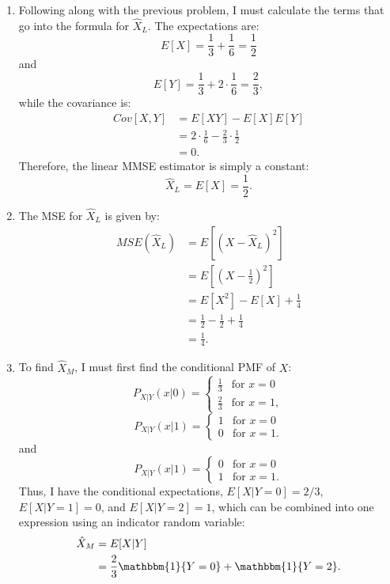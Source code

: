 \begin{problem}{12} $ $
\begin{enumerate}
\item Following along with the previous problem, I must calculate the terms that go into the formula for $\hat X_L$.  The expectations are:
\begin{equation*}
E[X] = \frac{1}{3}+\frac{1}{6} = \frac{1}{2}
\end{equation*}
and
\begin{equation*}
E[Y] = \frac{1}{3}+2\cdot \frac{1}{6} = \frac{2}{3},
\end{equation*}
while the covariance is:
\begin{align*}
Cov[X, Y] &= E[XY] -E[X]E[Y] \\
& = 2\cdot \frac{1}{6}-\frac{2}{3}\cdot \frac{1}{2} \\
& = 0.
\end{align*}
Therefore, the linear MMSE estimator is simply a constant:
\begin{equation*}
\hat X_L = E[X] = \frac{1}{2}.
\end{equation*}

\item The MSE for $\hat X_L$ is given by:
\begin{align*}
MSE(\hat X_L) & = E[(X-\hat X_L)^2] \\
& = E[(X-\frac{1}{2})^2] \\
& = E[X^2]-E[X]+\frac{1}{4} \\
& =\frac{1}{2}-\frac{1}{2}+\frac{1}{4} \\
& = \frac{1}{4}.
\end{align*}

\item To find $\hat X_M$, I must first find the conditional PMF of $X$:
\[
P_{X|Y}(x|0)=
  \begin{cases}
                                   \frac{1}{3}& \text{for $x=0$} \\
                                   \frac{2}{3} & \text{for $x=1$},
  \end{cases}
\]
\[
P_{X|Y}(x|1)=
  \begin{cases}
                                  1& \text{for $x=0$} \\
                                   0 & \text{for $x=1$}.
  \end{cases}
\]
and
\[
P_{X|Y}(x|1)=
  \begin{cases}
                                  0& \text{for $x=0$} \\
                                   1 & \text{for $x=1$}.
  \end{cases}
\]
Thus, I have the conditional expectations, $E[X|Y=0] = 2/3$, $E[X|Y=1] = 0$, and $E[X|Y=2] = 1$, which can be combined into one expression using an indicator random variable:
\begin{align*}
\hat X_M &= E[X|Y] \\
& =\frac{2}{3} \mathbbm{1} \{ Y=0\} + \mathbbm{1} \{ Y=2\}.
\end{align*}


\end{enumerate}
\end{problem}

